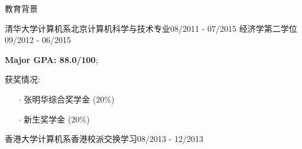 \documentclass{resume} %
\begin{document}
\vspace{-1.5em}
\begin{rSection}{教育背景}
\begin{eSubsection}{清华大学计算机系}{北京}{计算机科学与技术专业}{08/2011 - 07/2015}
{经济学第二学位}{09/2012 - 06/2015}
\item \textbf{Major GPA: 88.0/100};
\item 获奖情况:
\begin{itemize}
\itemsep -0.5em \vspace{-0.5em}
\item[$\cdot$] 张明华综合奖学金 (20\%)
\item[$\cdot$] 新生奖学金 (20\%)
\end{itemize}
\end{eSubsection}
\vspace{-0.8em}
\begin{rSubsection}{香港大学计算机系}{香港}{校派交换学习}{08/2013 - 12/2013}
\end{rSubsection}
\end{rSection}
\vspace{-1.0em}
\end{document}
